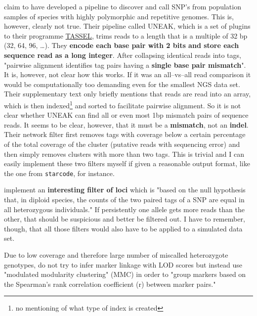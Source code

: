 \documentclass{article}\usepackage[]{graphicx}\usepackage[]{color}
\begin{document}
\cite{Lu2013} claim to have developed a pipeline to discover and call SNP's from population samples of species with highly polymorphic and repetitive genomes. This is, however, clearly not true. Their pipeline called UNEAK, which is a set of plugins to their programme \href{http://www.maizegenetics.net/#!tassel/c17q9}{TASSEL}, trims reads to a length that is a multiple of 32 bp (32, 64, 96, \ldots). They \textbf{encode each base pair with 2 bits and store each sequence read as a long integer}. After collapsing identical reads into tags, "pairwise alignment identifies tag pairs having a \textbf{single base pair mismatch}". It is, however, not clear how this works. If it was an all--vs--all read comparison it would be computationally too demanding even for the smallest NGS data set. Their supplementary text only briefly mentions that reads are read into an array, which is then indexed\footnote{no mentioning of what type of index is created} and sorted to facilitate pairwise alignment. So it is not clear whether UNEAK can find all or even most 1bp mismatch pairs of sequence reads. It seems to be clear, however, that it must be a \textbf{mismatch}, not an \textbf{indel}. Their network filter first removes tags with coverage below a certain percentage of the total coverage of the cluster (putative reads with sequencing error) and then simply removes clusters with more than two tags. This is trivial and I can easily implement these two filters myself if given a reasonable output format, like the one from \texttt{starcode}, for instance.

\cite{Lu2013} implement an \textbf{interesting filter of loci} which is "\textrm{based on the null hypothesis that, in diploid species, the counts of the two paired tags of a SNP are equal in all heterozygous individuals}." If persistently one allele gets more reads than the other, that should be suspicious and better be filtered out. I have to remember, though, that all those filters would also have to be applied to a simulated data set.

Due to low coverage and therefore large number of miscalled heterozygote genotypes, \cite{Lu2013} do not try to infer marker linkage with LOD scores but instead use "modulated modularity clustering" (MMC) \citep{Stone2009} in order to "group markers based on the Spearman's rank correlation coefficient (r) between marker pairs."
\end{document}

